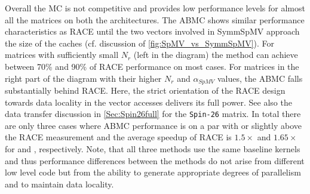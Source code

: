 Overall the \acrshort{MC} is not competitive and provides low performance levels for almost all the matrices on both the architectures. The \acrshort{ABMC} shows similar performance characteristics as \acrshort{RACE} until the two vectors involved in \acrshort{SymmSpMV} approach the size of the caches (cf. discussion of \cref{fig:SpMV_vs_SymmSpMV}). For matrices with sufficiently small $N_r$ (left in the diagram) the method can achieve between 70\% and 90\% of \acrshort{RACE} performance on most cases. For matrices in the right part of the diagram with their higher $N_r$ and $\alpha_{SpMV}$ values, the \acrshort{ABMC} falls substantially behind \acrshort{RACE}. Here, the strict orientation of the \acrshort{RACE} design towards data locality in the vector accesses delivers its full power. See also the data transfer discussion in \cref{Sec:Spin26full} for the \texttt{Spin-26} matrix.
In total there are only three cases where \acrshort{ABMC} performance is on a par with or slightly above the \acrshort{RACE} measurement and the average speedup of \acrshort{RACE} is $1.5\times$ and $1.65 \times$ for \IVB and \SKX, respectively.
Note, that all three methods use the same baseline kernels and thus performance differences between the methods do not arise from different low level code but from the ability to generate appropriate degrees of parallelism and to maintain data locality.

